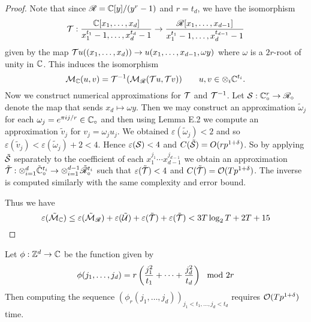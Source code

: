 \begin{proof}
    Note that since $\mathscr{R} = {\mathbb C}[y]/(y^{r} - 1)$ and $r = t_d$, we have the isomorphism
    \[
        \mathcal T: \frac{{\mathbb C}[x_1, \ldots, x_d]}{x_1^{t_1} - 1, \ldots, x_d^{t_d} - 1} \to \frac{\mathscr{R}[x_1, \ldots, x_{d-1}]}{x_1^{t_1} - 1, \ldots, x_d^{t_{d-1}} - 1}
    \]
    given by the map $\mathcal Tu((x_1, \ldots, x_d)) \to u(x_1, \ldots, x_{d-1}, \omega y)$ where $\omega$ is a $2r$-root of unity in ${\mathbb C}$. This induces the isomorphism 
    \[
        \mathcal M_{\mathbb C}(u, v) = \mathcal T^{-1}(\mathcal M_{\mathscr{R}}(\mathcal Tu, \mathcal Tv)) \qquad u, v \in \otimes_i {\mathbb C}^{t_i}.
    \]
    Now we construct numerical approximations for $\mathcal T$ and $\mathcal T^{-1}$. Let $\mathcal S: {\mathbb C}^r_\circ \to \mathscr{R}_\circ$ denote the map that sends $x_d \mapsto \omega y$. Then we may construct an approximation $\tilde{\omega}_j$ for each $\omega_j = e^{\pi i j / r} \in {\mathbb C}_\circ$ and then using Lemma E.2 we compute an approximation $\tilde{v}_j$ for $v_j = \omega_j u_j$. We obtained $\varepsilon(\tilde{\omega}_j) < 2$ and so $\varepsilon(\tilde{v}_j) < \varepsilon(\tilde{\omega}_j) + 2 < 4$. Hence $\varepsilon(\mathcal S) < 4$ and $C(\tilde{\mathcal S}) = O(r p^{1 + \delta})$. So by applying $\tilde{\mathcal S}$ separately to the coefficient of each $x_1^{j_1} \cdots x_{d-1}^{j_{d-1}}$ we obtain an approximation $\tilde{\mathcal T}: \otimes_{i=1}^d \tilde{{\mathbb C}}^{t_i}_\circ \to \otimes^{d-1}_{i=1} \tilde{\mathscr{R}}_\circ^{t_i}$ such that $\varepsilon(\tilde{\mathcal T}) < 4$ and $C(\tilde{\mathcal T}) = \mathcal O(Tp^{1 + \delta})$. The inverse is computed similarly with the same complexity and error bound.

    Thus we have
    \[
        \varepsilon(\tilde{\mathcal M}_{\mathbb C}) \le \varepsilon(\tilde{\mathcal M}_{\mathscr{R}}) + \varepsilon(\tilde{\mathcal U}) + \varepsilon(\tilde{\mathcal T}) + \varepsilon(\tilde{\mathcal T}) < 3T \log_2 T + 2T + 15
    \]
\end{proof}

\begin{lemma}\label{lem:compute-array}
    Let $\phi: {\mathbb Z}^d \to {\mathbb C}$ be the function given by
    \[
        \phi(j_1, \ldots, j_d) = r\left(\frac{j_1^2}{t_1} + \cdots + \frac{j_d^2}{t_d}\right) \mod 2r
    \]
    Then computing the sequence $(\phi_r(j_1, \ldots, j_d))_{j_1 < t_1, \ldots, j_d < t_d}$ requires $\mathcal O(Tp^{1 + \delta})$ time.
\end{lemma}

